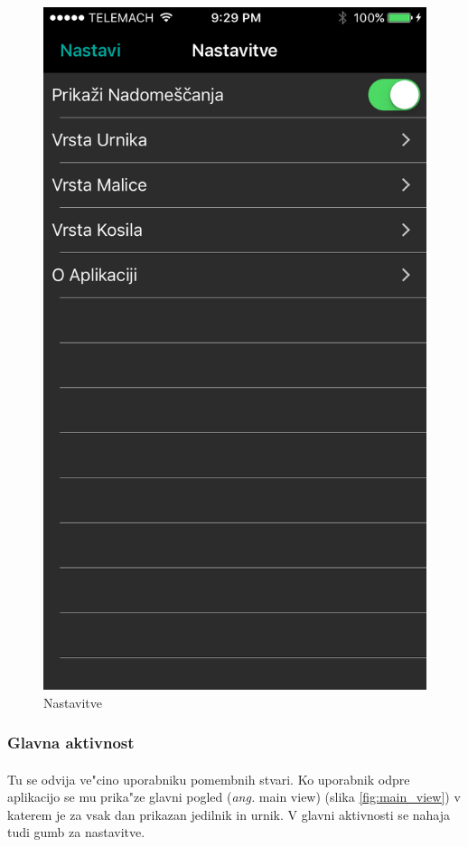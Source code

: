 \begin{figure}[!ht]
\begin{minipage}{0.45\linewidth}
		\includegraphics[width=\linewidth]{images/nastavitve.png}
		\caption{Nastavitve}\label{fig:settings}
	\end{minipage}
\end{figure}

\subsubsection{Glavna aktivnost}
\paragraph{}Tu se odvija ve"cino uporabniku pomembnih stvari. Ko uporabnik odpre aplikacijo se mu prika"ze glavni pogled (\textit{ang.} main view) (slika \ref{fig:main_view}) v katerem je za vsak dan prikazan jedilnik in urnik. V glavni aktivnosti se nahaja tudi gumb za nastavitve.

